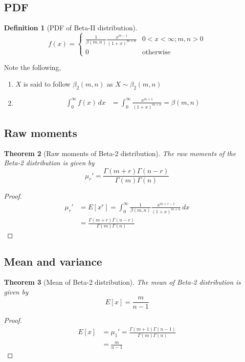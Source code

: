 \documentclass[oneside,11pt,pdftex]{book}%
\numberwithin{equation}{section}
\newtheorem{theorem}{Theorem}[chapter]%
\newtheorem{definition}[theorem]{Definition}
\numberwithin{section}{chapter}
\numberwithin{equation}{chapter}
\begin{document}
\subsection{PDF}
\begin{definition}[PDF of Beta-II distribution]
	\[ f(x)=\begin{cases}
		\frac{1}{\beta(m,n)}\frac{x^{m-1}}{(1+x)^{m+n}} & 0<x<\infty; m,n>0\\
		0 & \text{otherwise}
	\end{cases} \]
\end{definition}
Note the following,
\begin{enumerate}
	\item $ X $ is said to follow $ \beta_2(m,n) $ as $ X \sim \beta_2(m,n) $
	\item \begin{align*}
		\int_0^{\infty }f(x)\, dx&=\int_0^\infty \frac{x^{m+1}}{(1+x)^{m+n}}=\beta(m,n)
	\end{align*}
\end{enumerate}

\subsection{Raw moments}
\begin{theorem}[Raw moments of Beta-2 distribution]
	The raw moments of the Beta-2 distribution is given by \[ \mu_r'= \frac{\Gamma(m+r)\Gamma(n-r)}{\Gamma(m)\Gamma(n)} \]
\end{theorem}
\begin{proof}
	\begin{align*}
		\mu_r'&=E[x^r]=\int_0^{\infty} \frac{1}{\beta(m,n)}\frac{x^{m+r-1}}{(1+x)^{m+n}}\, dx\\
		&=\frac{\Gamma(m+r)\Gamma(n-r)}{\Gamma(m)\Gamma(n)}
	\end{align*}
\end{proof}

\subsection{Mean and variance}
\begin{theorem}[Mean of Beta-2 distribution]
	The mean of Beta-2 distribution is given by \[ E[x]=\frac{m}{n-1} \]
\end{theorem}
\begin{proof}
	\begin{align*}
		E[x]&=\mu_1'=\frac{\Gamma(m+1)\Gamma(n-1)}{\Gamma(m)\Gamma(n)}\\
		&=\frac{m}{n-1}
	\end{align*}
\end{proof}
\end{document}
